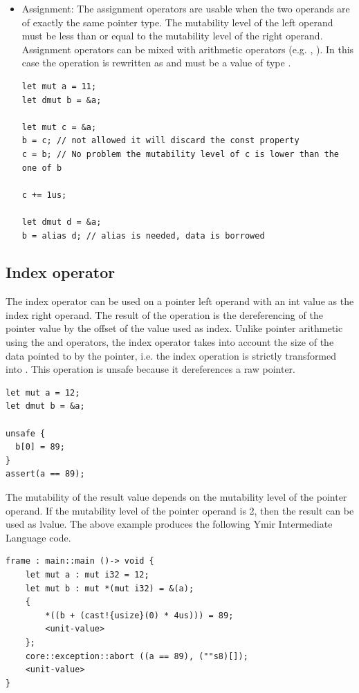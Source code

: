 \begin{itemize}
\item Assignment: The assignment operators are usable when the two operands
  are of exactly the same pointer type. The mutability level of the left operand
  must be less than or equal to the mutability level of the right operand.
  Assignment operators can be mixed with arithmetic operators (e.g. \token{+=},
  \token{-=}). In this case the operation is rewritten as 
  and  must be a value of type .

  \begin{lstlisting}[style=coloredverbatimError]
let mut a = 11;
let dmut b = &a;

let mut c = &a;
b = c; // not allowed it will discard the const property
c = b; // No problem the mutability level of c is lower than the one of b

c += 1us;

let dmut d = &a;
b = alias d; // alias is needed, data is borrowed
  \end{lstlisting}

\end{itemize}

\subsection {Index operator}

The index operator can be used on a pointer left operand with an int value as
the index right operand. The result of the operation is the dereferencing of the
pointer value by the offset of the value used as index. Unlike pointer
arithmetic using the \token{+} and \token{-} operators, the index operator
takes into account the size of the data pointed to by the pointer, i.e. the
index operation  is strictly transformed into . This operation is unsafe
because it dereferences a raw pointer.

\smallskip

\begin{lstlisting}[style=coloredverbatim]
let mut a = 12;
let dmut b = &a;

unsafe {
  b[0] = 89;
}
assert(a == 89);
\end{lstlisting}

\smallskip

The mutability of the result value depends on the mutability level of the
pointer operand. If the mutability level of the pointer operand is 2, then the
result can be used as lvalue. The above example produces the following Ymir Intermediate Language code.

\begin{lstlisting}[style=myilVerb]
frame : main::main ()-> void {
    let mut a : mut i32 = 12;
    let mut b : mut *(mut i32) = &(a);
    {
        *((b + (cast!{usize}(0) * 4us))) = 89;
        <unit-value>
    };
    core::exception::abort ((a == 89), (""s8)[]);
    <unit-value>
}
\end{lstlisting}

\vfill%
\pagebreak
